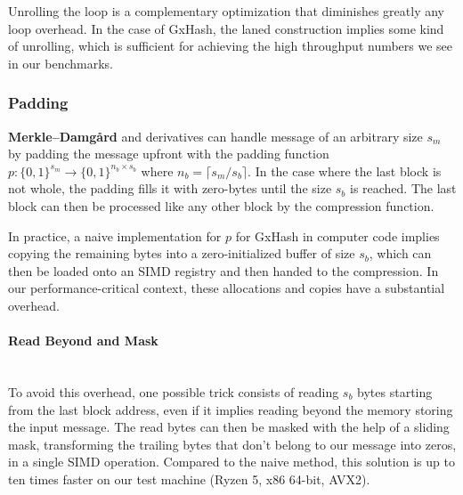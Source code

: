 \documentclass[10pt]{article}
\begin{document}
Unrolling the loop is a complementary optimization that diminishes greatly any loop overhead. In the case of GxHash, the laned construction implies some kind of unrolling, which is sufficient for achieving the high throughput numbers we see in our benchmarks.

\subsubsection{Padding}

\textbf{Merkle–Damgård} and derivatives can handle message of an arbitrary size \( s_m \) by padding the message upfront with the padding function \( p: \{0,1\}^{s_m} \to \{0,1\}^{n_b \times s_b} \) where \( n_b = \lceil s_m/s_b \rceil \). In the case where the last block is not whole, the padding fills it with zero-bytes until the size \( s_b \) is reached. The last block can then be processed like any other block by the compression function.

In practice, a naive implementation for \( p \) for GxHash in computer code implies copying the remaining bytes into a zero-initialized buffer of size \( s_b \), which can then be loaded onto an SIMD registry and then handed to the compression. In our performance-critical context, these allocations and copies have a substantial overhead.

\paragraph{Read Beyond and Mask}\leavevmode\\
To avoid this overhead, one possible trick consists of reading \( s_b \) bytes starting from the last block address, even if it implies reading beyond the memory storing the input message. The read bytes can then be masked with the help of a sliding mask, transforming the trailing bytes that don't belong to our message into zeros, in a single SIMD operation. Compared to the naive method, this solution is up to ten times faster on our test machine (Ryzen 5, x86 64-bit, AVX2).
\end{document}
